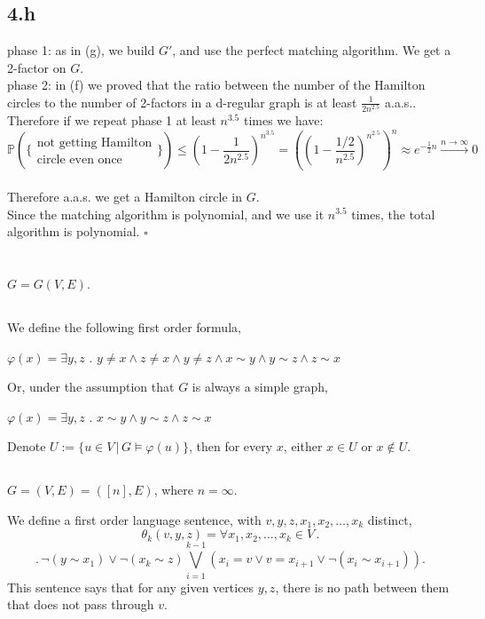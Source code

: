 \documentclass{article}
\begin{document}
\subsection*{4.h}
phase 1: as in (g), we build $G'$, and use the perfect matching algorithm. We get a 2-factor on $G$.\\
phase 2: in (f) we proved that the ratio between the number of the Hamilton circles to the number of 2-factors in a d-regular graph is at least $\frac{1}{2n^{2.5}}$ a.a.s.. Therefore if we repeat phase 1 at least $n^{3.5}$ times we have:
\[
\mathbb{P}(\{\substack{\text{not getting Hamilton} \\ \text{circle even once}}\})\leq(1-\frac{1}{2n^{2.5}})^{n^{3.5}}=((1-\frac{1/2}{n^{2.5}})^{n^{2.5}})^n\approx e^{-\frac{1}{2}n}\xrightarrow{n \to \infty}0
\]\\
Therefore a.a.s. we get a Hamilton circle in $G$.\\
Since the matching algorithm is polynomial, and we use it $n^{3.5}$ times, the total algorithm is polynomial.
\hfill $\square$
\section{}
$G=G(V,E)$.
\subsection{}
We define the following first order formula,

$\varphi(x)=\exists{y,z}$ . $y\neq{x}\land{z\neq{x}}\land{y\neq{z}}\land{x\sim{y}}\land{y\sim{z}}\land{z\sim{x}}$

Or, under the assumption that $G$ is always a simple graph,

$\varphi(x)=\exists{y,z}$ . $x\sim{y}\land{y\sim{z}}\land{z\sim{x}}$

Denote $U:=\{u\in{V}\,|\,{G\vDash\varphi(u)}\}$, then for every $x$, either $x\in{U}$ or $x\notin{U}$.
\subsection{}
$G=(V,E)=([n],E)$, where $n=\infty$.

We define a first order language sentence, with $v,y,z,x_1,x_2,\dots,x_k$ distinct,
\[\theta_k(v,y,z)=\forall{x_1,x_2,\dots,x_k}\in{V}\,.\]\[.\,\neg(y\sim{x_1})\lor\neg(x_k\sim{z})\bigvee_{i=1}^{k-1}(x_i=v\lor{v}=x_{i+1}\lor\neg(x_i\sim{x_{i+1}})).\]
This sentence says that for any given vertices $y,z$, there is no path between them that does not pass through $v$.
\end{document}
